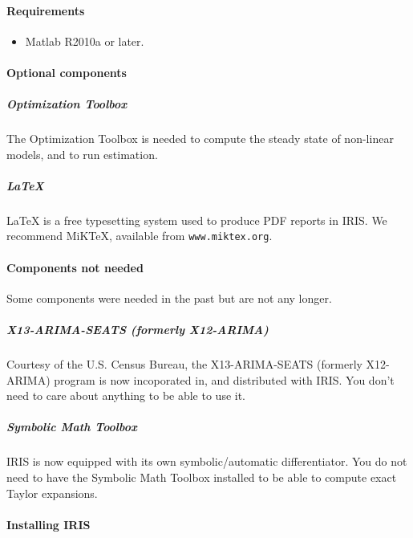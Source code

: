 

	\paragraph{Requirements}\label{requirements}

\begin{itemize}
\itemsep1pt\parskip0pt
\item
  Matlab R2010a or later.
\end{itemize}

\paragraph{Optional components}\label{optional-components}

\subparagraph{Optimization Toolbox}\label{optimization-toolbox}

The Optimization Toolbox is needed to compute the steady state of
non-linear models, and to run estimation.

\subparagraph{LaTeX}\label{latex}

LaTeX is a free typesetting system used to produce PDF reports in IRIS.
We recommend MiKTeX, available from \texttt{www.miktex.org}.

\paragraph{Components not needed}\label{components-not-needed}

Some components were needed in the past but are not any longer.

\subparagraph{X13-ARIMA-SEATS (formerly
X12-ARIMA)}\label{x13-arima-seats-formerly-x12-arima}

Courtesy of the U.S. Census Bureau, the X13-ARIMA-SEATS (formerly
X12-ARIMA) program is now incoporated in, and distributed with IRIS. You
don't need to care about anything to be able to use it.

\subparagraph{Symbolic Math Toolbox}\label{symbolic-math-toolbox}

IRIS is now equipped with its own symbolic/automatic differentiator. You
do not need to have the Symbolic Math Toolbox installed to be able to
compute exact Taylor expansions.

\paragraph{Installing IRIS}\label{installing-iris}

